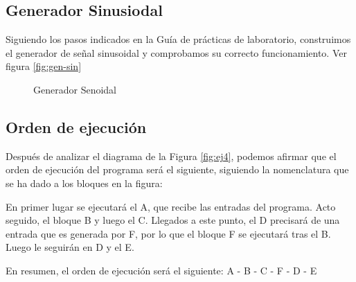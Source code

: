 \documentclass[10pt,a4paper,catalan]{article}
\begin{document}
\subsection{Generador Sinusiodal}

Siguiendo los pasos indicados en la Gu\'ia de pr\'acticas de laboratorio, construimos el generador de se\~nal sinusoidal y comprobamos su correcto funcionamiento. Ver figura \ref{fig:gen-sin}

\begin{figure}[H]
 \centering
 \vspace{0.5cm}
 \vspace{0.3cm}
 \caption{Generador Senoidal}
 \label{gen-sin}
\end{figure}


\subsection{Orden de ejecuci\'on}

Despu\'es de analizar el diagrama de la Figura \ref{fig:ej4}, podemos afirmar que el orden de ejecuci\'on del programa ser\'a el siguiente, siguiendo la nomenclatura que se ha dado a los bloques en la figura:

En primer lugar se ejecutar\'a el A, que recibe las entradas del programa. Acto seguido, el bloque B y luego el C. Llegados a este punto, el D precisar\'a de una entrada que es generada por F, por lo que el bloque F se ejecutar\'a tras el B. Luego le seguir\'an en D y el E.

En resumen, el orden de ejecuci\'on ser\'a el siguiente: A - B - C - F - D - E
\end{document}
